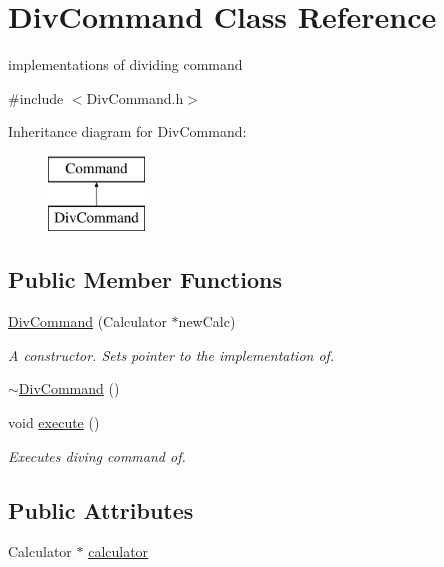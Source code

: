 \hypertarget{class_div_command}{}\section{Div\+Command Class Reference}
\label{class_div_command}


implementations of dividing command  




{\ttfamily \#include $<$Div\+Command.\+h$>$}

Inheritance diagram for Div\+Command\+:\begin{figure}[H]
\begin{center}
\leavevmode
\includegraphics[height=2.000000cm]{class_div_command}
\end{center}
\end{figure}
\subsection*{Public Member Functions}
\begin{DoxyCompactItemize}
\item 
\hyperlink{class_div_command_a5e28151ba2330f4d6847723d278d2dbc}{Div\+Command} (Calculator $\ast$new\+Calc)
\begin{DoxyCompactList}\small\item\em A constructor. Sets pointer to the implementation of. \end{DoxyCompactList}\item 
\hyperlink{class_div_command_a1f281490b6114835727417c9f0f7b67e}{$\sim$\+Div\+Command} ()
\item 
void \hyperlink{class_div_command_aca34d3ac23406928629550a6d1177e0a}{execute} ()
\begin{DoxyCompactList}\small\item\em Executes diving command of. \end{DoxyCompactList}\end{DoxyCompactItemize}
\subsection*{Public Attributes}
\begin{DoxyCompactItemize}
\item 
Calculator $\ast$ \hyperlink{class_div_command_a8773c788944f656a12c1653792abda07}{calculator}
\end{DoxyCompactItemize}


